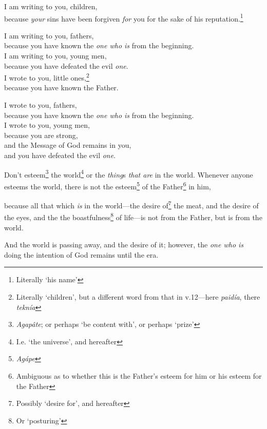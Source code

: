 \documentclass[article]{memoir}%
\newcounter{vnum}
\newcommand{\vnum}{%
	\textsuperscript{\thevnum}%
	\addtocounter{vnum}{1}%
}
\newcommand{\infer}[1]{\textit{#1}}
\newcommand{\focus}[1]{{#1}}
\newcommand{\lx}[1]{\textit{#1}}
\begin{document}
\indent \vnum I am writing to you, children,\\
\indent \indent because \infer{your} sins have been forgiven \infer{for} you for the sake of his reputation.\footnote{Literally `his name'} \\
\indent \vnum I am writing to you, fathers,\\
\indent \indent because you have known the \infer{one who is} from the beginning.\\
\indent I am writing to you, young men,\\
\indent \indent because you have defeated the evil \infer{one}.\\
\indent I wrote to you, little ones,\footnote{Literally `children', but a different word from that in v.12---here \lx{paidía}, there \lx{teknía}}\\
\indent \indent because you have known the Father.\\
\indent \vnum I wrote to you, fathers,\\
\indent \indent because you have known the \infer{one who is} from the beginning.\\
\indent I wrote to you, young men,\\
\indent \indent because you are strong,\\
\indent \indent \indent and the Message of God remains in you,\\
\indent \indent \indent and you have defeated the evil \infer{one}.

\vnum Don't esteem\footnote{\lx{Agapâte}; or perhaps `be content with', or perhaps `prize'} the world\footnote{I.e. `the universe', and hereafter} or the \infer{thing}s\infer{ that are} in the world. Whenever anyone esteems the world, there is not the esteem\footnote{\lx{Agápe}} of the Father\footnote{Ambiguous as to whether this is the Father's esteem for him or his esteem for the Father} in him, \vnum because all that which \infer{is} in the world---the desire of\footnote{Possibly `desire for', and hereafter} the meat, and the desire of the eyes, and the the boastfulness\footnote{Or `posturing'} of life---is \focus{not} from the Father, but is \focus{from the world}. \vnum And the world is passing away, and the desire of it; however, the \infer{one who is} doing the intention of God remains until the era.
\end{document}
